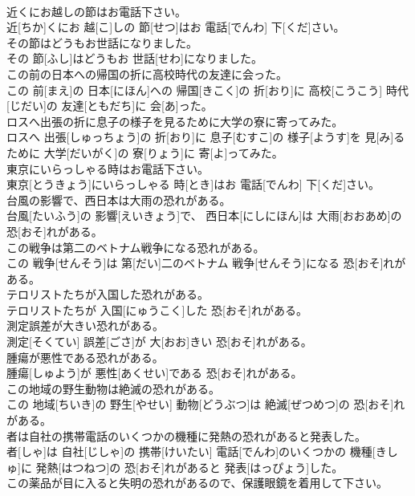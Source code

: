 \documentclass[8pt]{extreport}
\begin{document}
\begin{CJK}{UTF8}{min}
\\	近くにお越しの節はお電話下さい。	
\\	近[ちか]くにお 越[こ]しの 節[せつ]はお 電話[でんわ] 下[くだ]さい。
\\	その節はどうもお世話になりました。	
\\	その 節[ふし]はどうもお 世話[せわ]になりました。
\\	この前の日本への帰国の折に高校時代の友達に会った。	
\\	この 前[まえ]の 日本[にほん]への 帰国[きこく]の 折[おり]に 高校[こうこう] 時代[じだい]の 友達[ともだち]に 会[あ]った。
\\	ロスへ出張の折に息子の様子を見るために大学の寮に寄ってみた。	
\\	ロスへ 出張[しゅっちょう]の 折[おり]に 息子[むすこ]の 様子[ようす]を 見[み]るために 大学[だいがく]の 寮[りょう]に 寄[よ]ってみた。
\\	東京にいらっしゃる時はお電話下さい。	
\\	東京[とうきょう]にいらっしゃる 時[とき]はお 電話[でんわ] 下[くだ]さい。
\\	台風の影響で、西日本は大雨の恐れがある。	
\\	台風[たいふう]の 影響[えいきょう]で、 西日本[にしにほん]は 大雨[おおあめ]の 恐[おそ]れがある。
\\	この戦争は第二のベトナム戦争になる恐れがある。	
\\	この 戦争[せんそう]は 第[だい]二のベトナム 戦争[せんそう]になる 恐[おそ]れがある。
\\	テロリストたちが入国した恐れがある。	
\\	テロリストたちが 入国[にゅうこく]した 恐[おそ]れがある。
\\	測定誤差が大きい恐れがある。	
\\	測定[そくてい] 誤差[ごさ]が 大[おお]きい 恐[おそ]れがある。
\\	腫瘍が悪性である恐れがある。	
\\	腫瘍[しゅよう]が 悪性[あくせい]である 恐[おそ]れがある。
\\	この地域の野生動物は絶滅の恐れがある。	
\\	この 地域[ちいき]の 野生[やせい] 動物[どうぶつ]は 絶滅[ぜつめつ]の 恐[おそ]れがある。
\\	者は自社の携帯電話のいくつかの機種に発熱の恐れがあると発表した。	
\\	者[しゃ]は 自社[じしゃ]の 携帯[けいたい] 電話[でんわ]のいくつかの 機種[きしゅ]に 発熱[はつねつ]の 恐[おそ]れがあると 発表[はっぴょう]した。
\\	この薬品が目に入ると失明の恐れがあるので、保護眼鏡を着用して下さい。	

\end{CJK}
\end{document}
